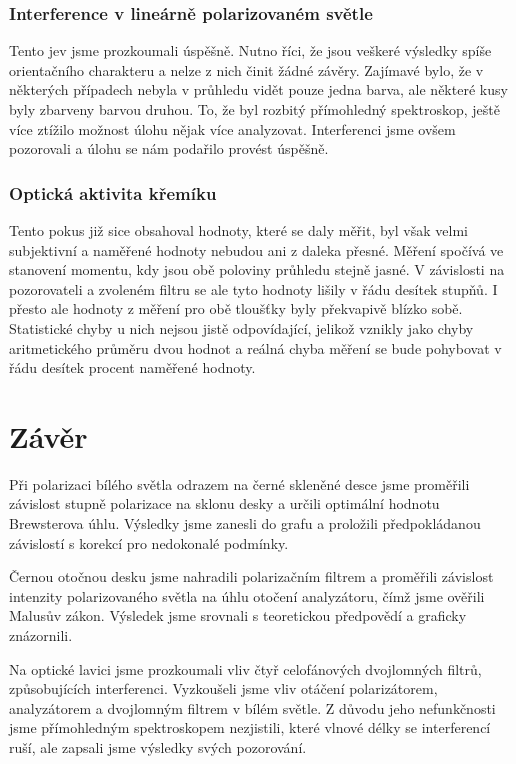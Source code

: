 \documentclass[english]{article}
\begin{document}
			\subsubsection{Interference v lineárně polarizovaném světle}
				Tento jev jsme prozkoumali úspěšně. Nutno říci, že jsou veškeré výsledky spíše orientačního charakteru a nelze z nich činit žádné závěry. Zajímavé bylo, že v některých případech nebyla v průhledu vidět pouze jedna barva, ale některé kusy byly zbarveny barvou druhou. To, že byl rozbitý přímohledný spektroskop, ještě více ztížilo možnost úlohu nějak více analyzovat. Interferenci jsme ovšem pozorovali a úlohu se nám podařilo provést úspěšně. 
				
			\subsubsection{Optická aktivita křemíku}
				Tento pokus již sice obsahoval hodnoty, které se daly měřit, byl však velmi subjektivní a naměřené hodnoty nebudou ani z daleka přesné. Měření spočívá ve stanovení momentu, kdy jsou obě poloviny průhledu stejně jasné. V závislosti na pozorovateli a zvoleném filtru se ale tyto hodnoty lišily v řádu desítek stupňů. I přesto ale hodnoty z měření pro obě tloušťky byly překvapivě blízko sobě. Statistické chyby u nich nejsou jistě odpovídající, jelikož vznikly jako chyby aritmetického průměru dvou hodnot a reálná chyba měření se bude pohybovat v řádu desítek procent naměřené hodnoty.  
				
			
\section{Závěr}
Při polarizaci bílého světla odrazem na černé skleněné desce jsme proměřili závislost stupně polarizace na sklonu desky a určili optimální hodnotu Brewsterova úhlu. Výsledky jsme zanesli do grafu a proložili předpokládanou závislostí s korekcí pro nedokonalé podmínky. 

Černou otočnou desku jsme nahradili polarizačním filtrem a proměřili závislost intenzity polarizovaného světla na úhlu otočení analyzátoru, čímž jsme ověřili Malusův zákon. Výsledek jsme srovnali s teoretickou předpovědí a graficky znázornili.

Na optické lavici jsme prozkoumali vliv čtyř celofánových dvojlomných filtrů, způsobujících interferenci. Vyzkoušeli jsme vliv otáčení polarizátorem, analyzátorem a dvojlomným filtrem v bílém světle. Z důvodu jeho nefunkčnosti jsme přímohledným spektroskopem nezjistili, které vlnové délky se interferencí ruší, ale zapsali jsme výsledky svých pozorování.
\end{document}
